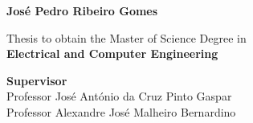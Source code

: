 \begin{center}
  {\myfontB \bf Jos\'e Pedro Ribeiro Gomes} \\
\end{center}


\vfill


\onehalfspace
\begin{center}
 {\myfontC Thesis to obtain the Master of Science Degree in}\\
 $ $ \\
 {\myfontB \bf Electrical and Computer Engineering}
\end{center}
\singlespace

\vfill

\onehalfspace


\begin{center}
{\myfontB \bf Supervisor} \\
$ $ \\
\myfontC
 { Professor Jos\'e Ant\'onio da Cruz Pinto Gaspar } \\
 { Professor Alexandre Jos\'e Malheiro Bernardino}
\end{center}

